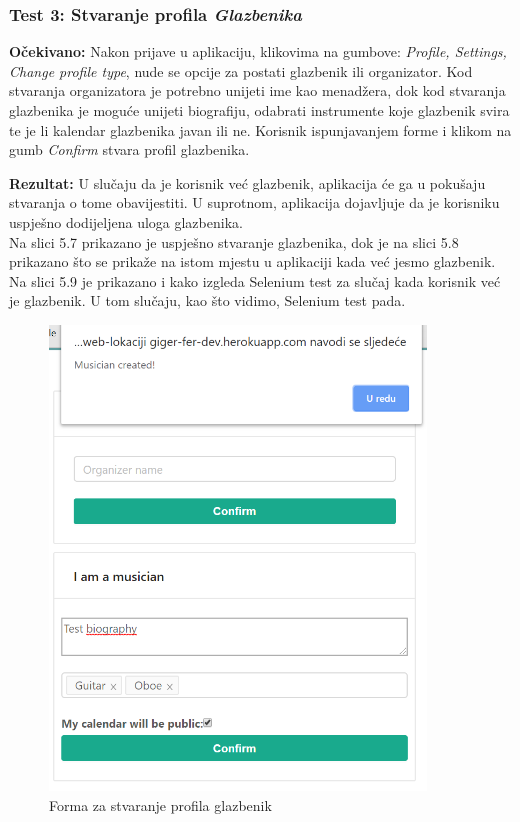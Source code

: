 		\subsubsection{Test 3: Stvaranje profila \textit{Glazbenika}}
		\textbf{Očekivano:} Nakon prijave u aplikaciju, klikovima na gumbove: \textit{Profile, Settings, Change profile type}, nude se opcije za postati glazbenik ili organizator. Kod stvaranja organizatora je potrebno unijeti ime kao menadžera, dok kod stvaranja glazbenika je moguće unijeti biografiju, odabrati instrumente koje glazbenik svira te je li kalendar glazbenika javan ili ne. 
		\noindent Korisnik ispunjavanjem forme i klikom na gumb \textit{Confirm} stvara profil glazbenika.

		\noindent\textbf{Rezultat:} U slučaju da je korisnik već glazbenik, aplikacija će ga u pokušaju stvaranja o tome obavijestiti. U suprotnom, aplikacija dojavljuje da je korisniku uspješno dodijeljena uloga glazbenika.\\
		
		
		Na slici 5.7 prikazano je uspješno stvaranje glazbenika, dok je na slici 5.8 prikazano što se prikaže na istom mjestu u aplikaciji kada već jesmo glazbenik. Na slici 5.9 je prikazano i kako izgleda Selenium test za slučaj kada korisnik već je glazbenik. U tom slučaju, kao što vidimo, Selenium test pada.
		
		\begin{figure}[H]
			\begin{center}
				\includegraphics[width=10cm]{slike/create_musician.PNG}
			\end{center}
			\caption{Forma za stvaranje profila glazbenik}
			\label{fig:crmus}
		\end{figure}
	

